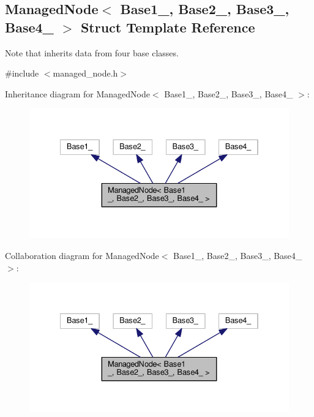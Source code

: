 \hypertarget{structManagedNode_3_01Base1___00_01Base2___00_01Base3___00_01Base4___01_4}{}\subsection{Managed\+Node$<$ Base1\+\_\+, Base2\+\_\+, Base3\+\_\+, Base4\+\_\+ $>$ Struct Template Reference}
\label{structManagedNode_3_01Base1___00_01Base2___00_01Base3___00_01Base4___01_4}


Note that inherits data from four base classes.  




{\ttfamily \#include $<$managed\+\_\+node.\+h$>$}



Inheritance diagram for Managed\+Node$<$ Base1\+\_\+, Base2\+\_\+, Base3\+\_\+, Base4\+\_\+ $>$\+:\nopagebreak
\begin{figure}[H]
\begin{center}
\leavevmode
\includegraphics[width=334pt]{structManagedNode_3_01Base1___00_01Base2___00_01Base3___00_01Base4___01_4__inherit__graph}
\end{center}
\end{figure}


Collaboration diagram for Managed\+Node$<$ Base1\+\_\+, Base2\+\_\+, Base3\+\_\+, Base4\+\_\+ $>$\+:\nopagebreak
\begin{figure}[H]
\begin{center}
\leavevmode
\includegraphics[width=334pt]{structManagedNode_3_01Base1___00_01Base2___00_01Base3___00_01Base4___01_4__coll__graph}
\end{center}
\end{figure}
